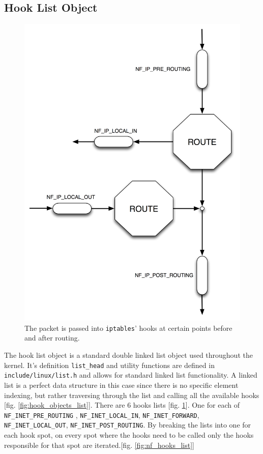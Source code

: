 \documentclass[a4paper,10pt]{article}
\newcommand{\code}[1]{\texttt{{#1}}}
\newcommand{\figref}[1]{[fig. \ref{#1}]}
\begin{document}
\subsection{Hook List Object}\label{hook_list_object}


\begin{figure}
\centering
\includegraphics[totalheight=0.40\textheight]{images/hooks.png}
\caption{The packet is passed into \code{iptables}' hooks at certain points
  before and after routing.}\label{fig:hooks}
\end{figure}

The hook list object is a standard double linked list object used throughout the kernel. It's definition \verb|list_head| and utility functions are defined in \verb|include/linux/list.h| and allows for standard linked list functionality. A linked list is a perfect data structure in this case since there is no specific element indexing, but rather traversing through the list and calling all the available hooks \figref{fig:hook_objects_list}. There are 6 hooks lists \figref{fig:hooks}. One for each of \verb|NF_INET_PRE_ROUTING| , \verb|NF_INET_LOCAL_IN|, \verb|NF_INET_FORWARD|, \verb|NF_INET_LOCAL_OUT|, \verb|NF_INET_POST_ROUTING|. By breaking the lists into one for each hook spot, on every spot where the hooks need to be called only the hooks responsible for that spot are iterated.\figref{fig:nf_hooks_list}
\end{document}
